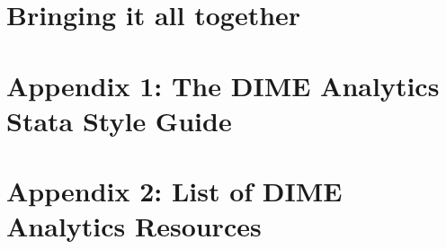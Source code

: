 
\chapter{Bringing it all together}




\chapter{Appendix 1: The DIME Analytics Stata Style Guide}
\label{ap:1}




\chapter{Appendix 2: List of DIME Analytics Resources}
\label{ap:2}





\backmatter




\printindex %


